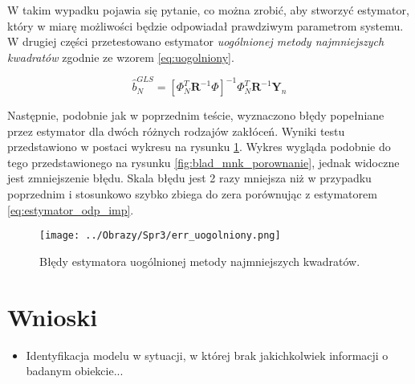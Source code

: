 \documentclass[12pt,a4paper]{article}
\begin{document}
W takim wypadku pojawia się pytanie, co można zrobić, aby stworzyć estymator, który w miarę możliwości będzie odpowiadał prawdziwym parametrom systemu.
W drugiej części przetestowano estymator \textit{uogólnionej metody najmniejszych kwadratów} zgodnie ze wzorem \ref{eq:uogolniony}.

\begin{equation}\label{eq:uogolniony}
\hat{b}_{N}^{GLS} = [\Phi_{N}^{T}\boldsymbol{R}^{-1}\Phi]^{-1}\Phi_{N}^{T}\boldsymbol{R}^{-1}\boldsymbol{Y}_{n}
\end{equation}

Następnie, podobnie jak w poprzednim teście, wyznaczono błędy popełniane przez estymator dla dwóch różnych rodzajów zakłóceń.
Wyniki testu przedstawiono w postaci wykresu na rysunku \ref{fig:err_uogolniony}.
Wykres wygląda podobnie do tego przedstawionego na rysunku \ref{fig:blad_mnk_porownanie}, jednak widoczne jest zmniejszenie błędu. Skala błędu jest 2 razy mniejsza niż w przypadku poprzednim i stosunkowo szybko zbiega do zera porównując z estymatorem \ref{eq:estymator_odp_imp}.


\begin{figure}[H]
\centering
\texttt{[image: ../Obrazy/Spr3/err\_uogolniony.png]} 
\caption{Błędy estymatora uogólnionej metody najmniejszych kwadratów.}
\label{fig:err_uogolniony}
\end{figure}


\section{Wnioski}
\begin{itemize}
\item Identyfikacja modelu w sytuacji, w której brak jakichkolwiek informacji o badanym obiekcie...
\end{itemize}



\nocite{rachunek2006jakubowski}
\nocite{wstep2001jakubowski}
 

\end{document}

